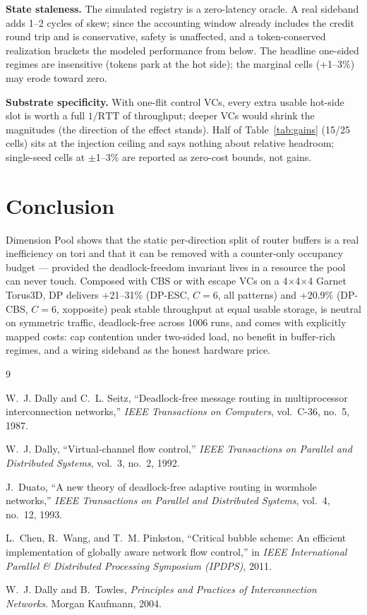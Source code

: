 \documentclass[10pt]{article}
\begin{document}
\textbf{State staleness.} The simulated registry is a zero-latency
oracle. A real sideband adds 1--2 cycles of skew; since the accounting
window already includes the credit round trip and is conservative, safety
is unaffected, and a token-conserved realization brackets the modeled
performance from below. The headline one-sided regimes are insensitive
(tokens park at the hot side); the marginal cells (+1--3\%) may erode
toward zero.

\textbf{Substrate specificity.} With one-flit control VCs, every extra
usable hot-side slot is worth a full $1/\text{RTT}$ of throughput; deeper
VCs would shrink the magnitudes (the direction of the effect stands).
Half of Table~\ref{tab:gains} (15/25 cells) sits at the injection ceiling
and says nothing about relative headroom; single-seed cells at $\pm$1--3\%
are reported as zero-cost bounds, not gains.

\section{Conclusion}

Dimension Pool shows that the static per-direction split of router
buffers is a real inefficiency on tori and that it can be removed with a
counter-only occupancy budget --- provided the deadlock-freedom invariant
lives in a resource the pool can never touch. Composed with CBS or with
escape VCs on a 4$\times$4$\times$4 Garnet Torus3D, DP delivers
+21--31\% (DP-ESC, $C{=}6$, all patterns) and +20.9\% (DP-CBS, $C{=}6$,
xopposite) peak stable throughput at equal usable storage, is neutral on
symmetric traffic, deadlock-free across 1006 runs, and comes with
explicitly mapped costs: cap contention under two-sided load, no benefit
in buffer-rich regimes, and a wiring sideband as the honest hardware
price.

\begin{thebibliography}{9}

W.~J. Dally and C.~L. Seitz,
``Deadlock-free message routing in multiprocessor interconnection
networks,''
\emph{IEEE Transactions on Computers}, vol.~C-36, no.~5, 1987.

W.~J. Dally,
``Virtual-channel flow control,''
\emph{IEEE Transactions on Parallel and Distributed Systems}, vol.~3,
no.~2, 1992.

J.~Duato,
``A new theory of deadlock-free adaptive routing in wormhole networks,''
\emph{IEEE Transactions on Parallel and Distributed Systems}, vol.~4,
no.~12, 1993.

L.~Chen, R.~Wang, and T.~M. Pinkston,
``Critical bubble scheme: An efficient implementation of globally aware
network flow control,''
in \emph{IEEE International Parallel \& Distributed Processing Symposium
(IPDPS)}, 2011.

W.~J. Dally and B.~Towles,
\emph{Principles and Practices of Interconnection Networks}.
Morgan Kaufmann, 2004.

\end{thebibliography}
\end{document}
